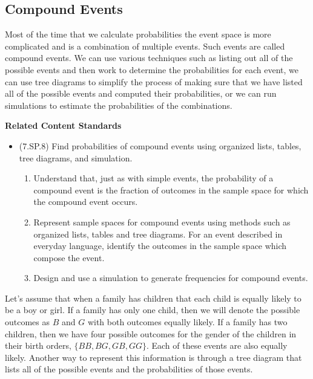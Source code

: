 \documentclass[
]{book}
\providecommand{\tightlist}{%
  \setlength{\itemsep}{0pt}\setlength{\parskip}{0pt}}
\newenvironment{standards}{}{}
\theoremstyle{definition}
\theoremstyle{definition}
\theoremstyle{definition}
\theoremstyle{definition}
\theoremstyle{remark}
\begin{document}
\hypertarget{compound-events}{%
\subsection{Compound Events}\label{compound-events}}

Most of the time that we calculate probabilities the event space is more complicated and is a combination of multiple events. Such events are called compound events. We can use various techniques such as listing out all of the possible events and then work to determine the probabilities for each event, we can use tree diagrams to simplify the process of making sure that we have listed all of the possible events and computed their probabilities, or we can run simulations to estimate the probabilities of the combinations.

\begin{standards}

\begin{center}
\textbf{Related Content Standards}

\end{center}

\begin{itemize}
\item
  (7.SP.8) Find probabilities of compound events using organized lists, tables, tree diagrams, and simulation.

  \begin{enumerate}
  \def\labelenumi{\alph{enumi}.}
  \tightlist
  \item
    Understand that, just as with simple events, the probability of a compound event is the fraction of outcomes in the sample space for which the compound event occurs.
  \item
    Represent sample spaces for compound events using methods such as organized lists, tables and tree diagrams. For an event described in everyday language, identify the outcomes in the sample space which compose the event.
  \item
    Design and use a simulation to generate frequencies for compound events.
  \end{enumerate}
\end{itemize}

\end{standards}

Let's assume that when a family has children that each child is equally likely to be a boy or girl. If a family has only one child, then we will denote the possible outcomes as \(B\) and \(G\) with both outcomes equally likely. If a family has two children, then we have four possible outcomes for the gender of the children in their birth orders, \(\{ BB, BG, GB, GG\}\). Each of these events are also equally likely. Another way to represent this information is through a tree diagram that lists all of the possible events and the probabilities of those events.
\end{document}
